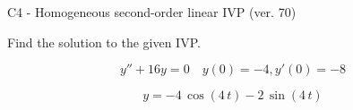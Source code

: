 \begin{exercise}
  \begin{exerciseTitle}C4 - Homogeneous second-order linear IVP (ver. 70)\end{exerciseTitle}
  \begin{exerciseStatement}
    
Find the solution to the given IVP.

    
\[y''+16y = 0 \hspace{1em} y(0) = -4 , y'(0) = -8\]

  \end{exerciseStatement}
  \begin{exerciseAnswer}
    
\[y= -4 \, \cos\left(4 \, t\right) - 2 \, \sin\left(4 \, t\right)\]

  \end{exerciseAnswer}
\end{exercise}